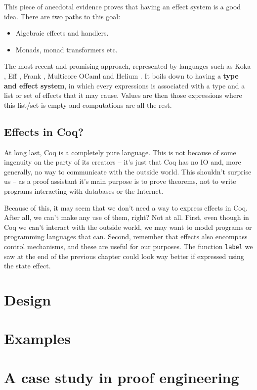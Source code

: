 \documentclass[declaration,inz,english,shortabstract]{iithesis}
\newcommand{\m}[1]{\texttt{#1}}
\begin{document}
This piece of anecdotal evidence proves that having an effect system is a good idea. There are two paths to this goal:

\begin{itemize}
    \item Algebraic effects and handlers.
    \item Monads, monad transformers etc.
\end{itemize}

The most recent and promising approach, represented by languages such as Koka \cite{Koka}, Eff \cite{Eff}, Frank \cite{Frank}, Multicore OCaml \cite{MulticoreOCaml} and Helium \cite{Helium}. It boils down to having a \textbf{type and effect system}, in which every expressions is associated with a type and a list or set of effects that it may cause. Values are then those expressions where this list/set is empty and computations are all the rest.

\section{Effects in Coq?}

At long last, Coq is a completely pure language. This is not because of some ingenuity on the party of its creators -- it's just that Coq has no IO and, more generally, no way to communicate with the outside world. This shouldn't surprise us -- as a proof assistant it's main purpose is to prove theorems, not to write programs interacting with databases or the Internet.

Because of this, it may seem that we don't need a way to express effects in Coq. After all, we can't make any use of them, right? Not at all. First, even though in Coq we can't interact with the outside world, we may want to model programs or programming languages that can. Second, remember that effects also encompass control mechanisms, and these are useful for our purposes. The function \m{label} we saw at the end of the previous chapter could look way better if expressed using the state effect.

\chapter{Design}

\chapter{Examples}

\chapter{A case study in proof engineering}
\end{document}
